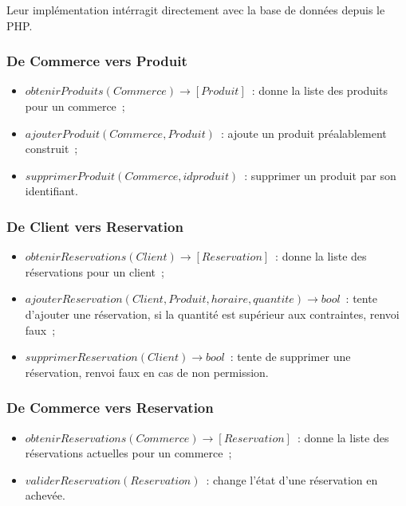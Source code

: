 \documentclass[a4paper,12pt]{article}
\begin{document}
Leur implémentation intérragit directement avec la base de données depuis le PHP.

\subsubsection{De Commerce vers Produit}

\begin{itemize}
	\item $obtenirProduits(Commerce) \rightarrow [Produit]$~: donne la liste des produits pour un commerce~;
	\item $ajouterProduit(Commerce, Produit)$~: ajoute un produit préalablement construit~;
	\item $supprimerProduit(Commerce, idproduit)$~: supprimer un produit par son identifiant.
\end{itemize}

\subsubsection{De Client vers Reservation}

\begin{itemize}
	\item $obtenirReservations(Client) \rightarrow [Reservation]$~: donne la liste des réservations pour un client~;
	\item $ajouterReservation(Client, Produit, horaire, quantite) \rightarrow bool$~: tente d'ajouter une réservation, si la quantité est supérieur aux contraintes, renvoi faux~;
	\item $supprimerReservation(Client) \rightarrow bool$~: tente de supprimer une réservation, renvoi faux en cas de non permission.
\end{itemize}

\subsubsection{De Commerce vers Reservation}

\begin{itemize}
	\item $obtenirReservations(Commerce) \rightarrow [Reservation]$~: donne la liste des réservations actuelles pour un commerce~;
	\item $validerReservation(Reservation)$~: change l'état d'une réservation en achevée.
\end{itemize}
\end{document}
